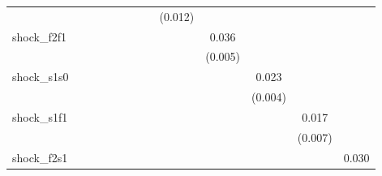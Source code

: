 {\begin{tabular}{l*{12}{c}}
            &                     &                     &                     &                     &                     &                     &                     &     (0.012)         &                     &                     &                     &                     \\
\addlinespace
shock\_f2f1  &                     &                     &                     &                     &                     &                     &                     &                     &       0.036\sym{***}&                     &                     &                     \\
            &                     &                     &                     &                     &                     &                     &                     &                     &     (0.005)         &                     &                     &                     \\
\addlinespace
shock\_s1s0  &                     &                     &                     &                     &                     &                     &                     &                     &                     &       0.023\sym{***}&                     &                     \\
            &                     &                     &                     &                     &                     &                     &                     &                     &                     &     (0.004)         &                     &                     \\
\addlinespace
shock\_s1f1  &                     &                     &                     &                     &                     &                     &                     &                     &                     &                     &       0.017\sym{**} &                     \\
            &                     &                     &                     &                     &                     &                     &                     &                     &                     &                     &     (0.007)         &                     \\
\addlinespace
shock\_f2s1  &                     &                     &                     &                     &                     &                     &                     &                     &                     &                     &                     &       0.030\sym{***}\\

\end{tabular}}
